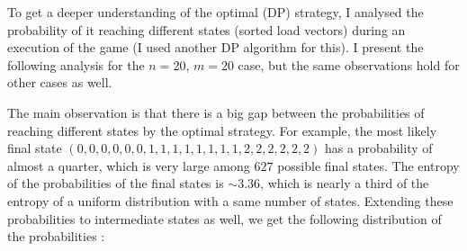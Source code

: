 To get a deeper understanding of the optimal (DP) strategy, I analysed the probability of it reaching different states (sorted load vectors) during an execution of the game (I used another DP algorithm for this). I present the following analysis for the $n=20$, $m=20$ case, but the same observations hold for other cases as well.

The main observation is that there is a big gap between the probabilities of reaching different states by the optimal strategy. For example, the most likely final state $(0, 0, 0, 0, 0, 0, 1, 1, 1, 1, 1, 1, 1, 1, 2, 2, 2, 2, 2, 2)$ has a probability of almost a quarter, which is very large among $627$ possible final states. The entropy of the probabilities of the final states is $\sim 3.36$, which is nearly a third of the entropy of a uniform distribution with a same number of states. Extending these probabilities to intermediate states as well, we get the following distribution of the probabilities :



